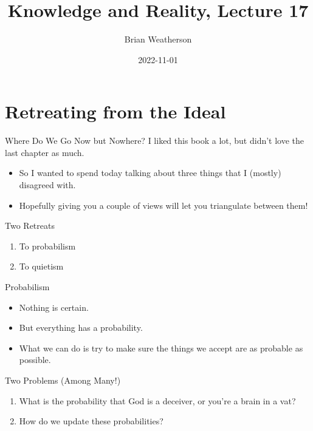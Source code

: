 \documentclass[
  17pt,
  letterpaper,
  ignorenonframetext,
  aspectratio=169,
]{beamer}
\title{Knowledge and Reality, Lecture 17}
\author{Brian Weatherson}
\date{2022-11-01}
\providecommand{\tightlist}{%
  \setlength{\itemsep}{0pt}\setlength{\parskip}{0pt}}\usepackage{longtable,booktabs,array}
\begin{document}
\frame{\titlepage}
\ifdefined\Shaded\renewenvironment{Shaded}{\begin{tcolorbox}[sharp corners, borderline west={3pt}{0pt}{shadecolor}, boxrule=0pt, interior hidden, enhanced, frame hidden, breakable]}{\end{tcolorbox}}\fi

\hypertarget{retreating-from-the-ideal}{%
\section{Retreating from the Ideal}\label{retreating-from-the-ideal}}

\begin{frame}{Where Do We Go Now but Nowhere?}
\protect\hypertarget{where-do-we-go-now-but-nowhere}{}
I liked this book a lot, but didn't love the last chapter as much.

\begin{itemize}[<+->]
\tightlist
\item
  So I wanted to spend today talking about three things that I (mostly)
  disagreed with.
\item
  Hopefully giving you a couple of views will let you triangulate
  between them!
\end{itemize}
\end{frame}

\begin{frame}{Two Retreats}
\protect\hypertarget{two-retreats}{}
\begin{enumerate}[<+->]
\tightlist
\item
  To probabilism
\item
  To quietism
\end{enumerate}
\end{frame}

\begin{frame}{Probabilism}
\protect\hypertarget{probabilism}{}
\begin{itemize}[<+->]
\tightlist
\item
  Nothing is certain.
\item
  But everything has a probability.
\item
  What we can do is try to make sure the things we accept are as
  probable as possible.
\end{itemize}
\end{frame}

\begin{frame}{Two Problems (Among Many!)}
\protect\hypertarget{two-problems-among-many}{}
\begin{enumerate}[<+->]
\tightlist
\item
  What is the probability that God is a deceiver, or you're a brain in a
  vat?
\item
  How do we update these probabilities?
\end{enumerate}
\end{frame}
\end{document}
